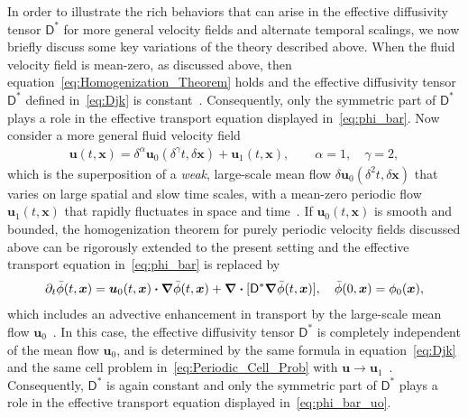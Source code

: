 \documentclass[leqno,onefignum,onetabnum]{siamltex1213}
\newcommand{\Dm}{\mathsf{D}}
\newcommand\bnabla{\mbox{\boldmath${\nabla}$}}
\providecommand\bcdot{\boldsymbol{\cdot}}
\newcommand{\vecx}{\boldsymbol{x}}
\newcommand{\vecu}{\boldsymbol{u}}
\newcommand{\vecxi}{\boldsymbol{\xi}}
\begin{document}
In order to illustrate the rich behaviors that can arise in the effective
diffusivity tensor $\Dm^*$ for more general velocity fields and
alternate temporal scalings, we now briefly discuss some key variations
of the theory described above. When the 
fluid velocity field is mean-zero, as discussed above, then
equation~\eqref{eq:Homogenization_Theorem} holds and the effective
diffusivity tensor $\Dm^*$ defined in~\eqref{eq:Djk} is
constant~\cite{Majda:Kramer:1999:book}. Consequently, only the
symmetric part of $\Dm^*$ plays a role in the effective transport
equation displayed in~\eqref{eq:phi_bar}. Now consider a more general
fluid velocity field
%
\begin{align}\label{eq:Velocity_field_uo_u1}
  \vecu(t,\vecx)=\delta^\alpha\vecu_0(\delta^\gamma t,\delta\vecx)+\vecu_1(t,\vecx),
  \qquad
  \alpha=1, \quad
  \gamma=2,
\end{align}
%
which is the superposition of a \emph{weak}, large-scale mean flow
$\delta\vecu_0(\delta^2t,\delta\vecx)$ that varies on large spatial and slow time
scales, with a mean-zero periodic flow $\vecu_1(t,\vecx)$ that rapidly
fluctuates in space and time~\cite{Majda:Kramer:1999:book}.
If $\vecu_0(t,\vecx)$ is smooth and bounded, the homogenization
theorem for purely periodic velocity fields discussed above can be
rigorously extended to the present setting and the effective transport
equation in~\eqref{eq:phi_bar} is replaced
by~\cite{Majda:Kramer:1999:book}   
%
\begin{align}\label{eq:phi_bar_uo}
  \partial_t\bar{\phi}(t,\vecx)=\vecu_0(t,\vecx)\bcdot\bnabla\bar{\phi}(t,\vecx)
                   +\bnabla\bcdot[\Dm^*\bnabla\bar{\phi}(t,\vecx)],
  \quad 
  \bar{\phi}(0,\vecx)=\phi_0(\vecx),
\end{align}
%
which includes an advective enhancement in transport by the
large-scale mean flow $\vecu_0$~\cite{Majda:Kramer:1999:book}. In this
case, the effective diffusivity tensor $\Dm^*$ is completely
independent of the mean flow $\vecu_0$, and is determined by the same
formula in equation~\eqref{eq:Djk} and the same cell problem
in~\eqref{eq:Periodic_Cell_Prob} with
$\vecu\to\vecu_1$~\cite{Majda:Kramer:1999:book}. Consequently, $\Dm^*$
is again constant and only the symmetric part of $\Dm^*$ plays
a role in the effective transport equation displayed
in~\eqref{eq:phi_bar_uo}.
\end{document}
